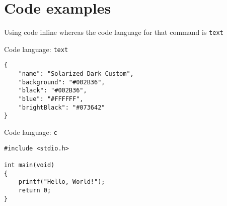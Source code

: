 \section{Code examples}

Using code inline  whereas the code language for that command is \texttt{text}


Code language: \texttt{text}
\begin{verbatim}
{
    "name": "Solarized Dark Custom",
    "background": "#002B36",
    "black": "#002B36",
    "blue": "#FFFFFF",
    "brightBlack": "#073642"
}
\end{verbatim}

Code language: \texttt{c}
\begin{verbatim}
#include <stdio.h>

int main(void)
{
    printf("Hello, World!");
    return 0;
}
\end{verbatim}